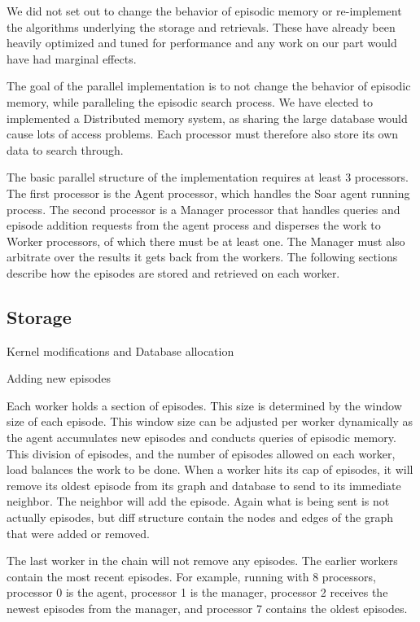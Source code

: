 \documentclass[11pt]{article} %
\begin{document}
We did not set out to change the behavior of episodic memory or re-implement the
algorithms underlying the storage and retrievals. These have already been
heavily optimized and tuned for performance and any work on our part would have
had marginal effects.




The goal of the parallel implementation is to not change the behavior of
episodic memory, while paralleling the episodic search process. We have elected
to implemented a Distributed memory system, as sharing the large database would
cause lots of access problems. Each processor must therefore also store its own
data to search through.

The basic parallel structure of the implementation requires at least 3
processors. The first processor is the Agent processor, which handles the Soar
agent running process. The second processor is a Manager processor that handles
queries and episode addition requests from the agent process and disperses the
work to Worker processors, of which there must be at least one. The Manager must
also arbitrate over the results it gets back from the workers. The following
sections describe how the episodes are stored and retrieved on each worker.

\subsection{Storage}

Kernel modifications and Database allocation

Adding new episodes

Each worker holds a section of episodes. This size is determined by the window
size of each episode. This window size can be adjusted per worker dynamically as
the agent accumulates new episodes and conducts queries of episodic memory. This
division of episodes, and the number of episodes allowed on each worker, load
balances the work to be done. When a worker hits its cap of episodes, it will
remove its oldest episode from its graph and database to send to its immediate
neighbor. The neighbor will add the episode. Again what is being sent is not
actually episodes, but diff structure contain the nodes and edges of the graph
that were added or removed.

The last worker in the chain will not remove any episodes. The earlier workers
contain the most recent episodes. For example, running with 8 processors,
processor 0 is the agent, processor 1 is the manager, processor 2 receives the
newest episodes from the manager, and processor 7 contains the oldest episodes.
\end{document}
